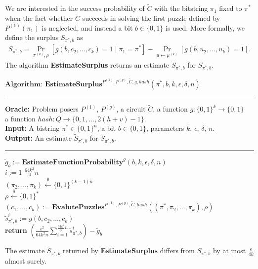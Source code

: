 We are interested in the success probability of $\widetilde{C}$ with the bitstring $\pi_1$ fixed to $\pi^*$ when
the fact whether $\widetilde{C}$ succeeds in solving the first puzzle defined by $P^{(1)}(\pi_1)$ is neglected, and
instead a bit $b \in \{0,1\}$ is used. More formally, we define the surplus $S_{\pi^*, b}$ as
\begin{align}
  \label{eq:s_pi_b}
S_{\pi^*, b} = \underset{\pi^{(k)}, \rho}{\Pr}\left[g(b, c_2, \dots, c_k) = 1 \mid \pi_1 = \pi^*\right] - \underset{u \leftarrow \mu^{(k)}}{\Pr}\left[g(b, u_2, \dots, u_k) = 1\right].
\end{align}
%
The algorithm \textbf{EstimateSurplus} returns an estimate $\widetilde{S}_{\pi^*, b}$ for $S_{\pi^*, b}$.
%
\begin{codeblock}
  $\textbf{Algorithm: EstimateSurplus}^{P^{(1)}, P^{(g)}, \widetilde{C}, g, hash}(\pi^*, b, k, \epsilon, \delta, n)$
  \medskip
  \hrule
  \medskip
  \textbf{Oracle:} Problem posers $P^{(1)}$, $P^{(g)}$, a circuit $\widetilde{C}$, a function $g: \{0,1\}^{k} \rightarrow \{0,1\}$ \\
  \IndII a function $hash : Q \rightarrow \{0,1,\dots, 2(h+v)-1\}$.\\
  \textbf{Input:} A bistring $\pi^* \in \{0,1\}^{n}$, a bit $b \in \{0,1\}$, parameters $k$, $\epsilon$, $\delta$, $n$.\\
  \textbf{Output:} An estimate $\widetilde{S}_{\pi^*, b}$ for $S_{\pi^*, b}$.
  \medskip\hrule\medskip
  $\widetilde{g}_b := \textbf{EstimateFunctionProbability}^{g}(b, k, \epsilon, \delta, n)$ \\
  \For $i:=1$ \To $\frac{64k^2}{\epsilon^2}n$ \Do \\
  \IndI $(\pi_{2}, \dots, \pi_k) \xleftarrow{\$} \{0,1\}^{(k-1)n}$\\
  \IndI $\rho \xleftarrow{\$} \{0,1\}^{*}$\\
  \IndI $(c_1, \dots, c_k) := \textbf{EvalutePuzzles}^{P^{(1)}, P^{(g)}, \widetilde{C}, hash}((\pi^*, \pi_2, \dots, \pi_k), \rho)$\\
  \IndI $\widetilde{s}_{\pi^*,b}^i := g(b, c_{2}, \dots, c_k)$\\
  \textbf{return} $\left(\frac{\epsilon^2}{64k^2n} \sum_{i=1}^{\frac{64k^2}{\epsilon^2} n} \widetilde{s}_{\pi^*,b}^i \right) - \widetilde{g}_b$\\
\end{codeblock}
%
\begin{lemma}
  \label{lemma:surplus_estimate}
The estimate $\widetilde{S}_{\pi^*,b}$ returned by \textbf{EstimateSurplus} differs from $S_{\pi^*, b}$ by at most $\frac{\epsilon}{4k}$ almost surely.
\end{lemma}

